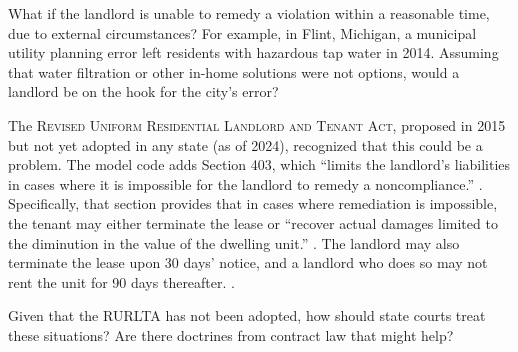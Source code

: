 
\item What if the landlord is unable to remedy a violation within a reasonable
time, due to external circumstances? For example, in Flint, Michigan, a
municipal utility planning error left residents with hazardous tap water in
2014. Assuming that water filtration or other in-home solutions were not
options, would a landlord be on the hook for the city's error?

The \textsc{Revised Uniform Residential Landlord and Tenant Act}, proposed in
2015 but not yet adopted in any state (as of 2024), recognized that this could
be a problem. The model code adds Section 403, which ``limits the landlord's
liabilities in cases where it is impossible for the landlord to remedy a
noncompliance.'' . Specifically, that section provides
that in cases where remediation is impossible, the tenant may either terminate
the lease or ``recover actual damages limited to the diminution in the value of
the dwelling unit.'' . The landlord may also
terminate the lease upon 30 days' notice, and a landlord who does so may not
rent the unit for 90 days thereafter. .

Given that the RURLTA has not been adopted, how should state courts treat these
situations? Are there doctrines from contract law that might help?



